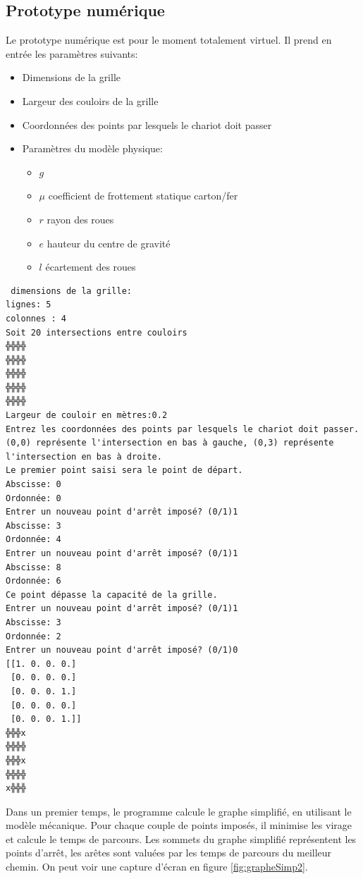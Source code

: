 \subsection{Prototype numérique}
Le prototype numérique est pour le moment totalement virtuel. Il prend en entrée les paramètres suivants:
\begin{itemize}
	\item Dimensions de la grille
	\item Largeur des couloirs de la grille
	\item Coordonnées des points par lesquels le chariot doit passer
	\item Paramètres du modèle physique:
		\begin{itemize}
			\item $g$
			\item $\mu$ coefficient de frottement statique carton/fer
			\item $r$ rayon des roues
			\item $e$ hauteur du centre de gravité
			\item $l$ écartement des roues
		\end{itemize}
\end{itemize}
\begin{verbatim}
 dimensions de la grille:
lignes: 5
colonnes : 4
Soit 20 intersections entre couloirs
╬╬╬╬
╬╬╬╬
╬╬╬╬
╬╬╬╬
╬╬╬╬
Largeur de couloir en mètres:0.2
Entrez les coordonnées des points par lesquels le chariot doit passer. (0,0) représente l'intersection en bas à gauche, (0,3) représente l'intersection en bas à droite.
Le premier point saisi sera le point de départ.
Abscisse: 0
Ordonnée: 0
Entrer un nouveau point d'arrêt imposé? (0/1)1
Abscisse: 3
Ordonnée: 4
Entrer un nouveau point d'arrêt imposé? (0/1)1
Abscisse: 8
Ordonnée: 6
Ce point dépasse la capacité de la grille.
Entrer un nouveau point d'arrêt imposé? (0/1)1
Abscisse: 3
Ordonnée: 2
Entrer un nouveau point d'arrêt imposé? (0/1)0
[[1. 0. 0. 0.]
 [0. 0. 0. 0.]
 [0. 0. 0. 1.]
 [0. 0. 0. 0.]
 [0. 0. 0. 1.]]
╬╬╬x
╬╬╬╬
╬╬╬x
╬╬╬╬
x╬╬╬
\end{verbatim}
Dans un premier temps, le programme calcule le graphe simplifié, en utilisant le modèle mécanique. Pour chaque couple de points imposés, il minimise les virage et calcule le temps de parcours. Les sommets du graphe simplifié représentent les points d'arrêt, les arêtes sont valuées par les temps de parcours du meilleur chemin. On peut voir une capture d'écran en figure \ref{fig:grapheSimp2}.
